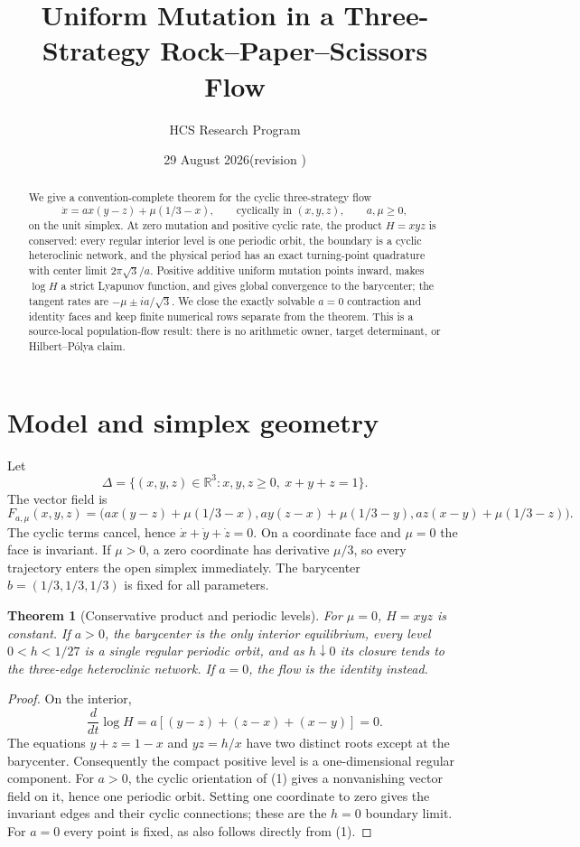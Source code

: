 \documentclass[10pt]{article}
\title{Uniform Mutation in a Three-Strategy Rock--Paper--Scissors Flow}
\author{HCS Research Program}
\date{29 August 2026\quad (revision \CRevisionRound)}
\newtheorem{theorem}{Theorem}
\newcommand{\R}{\mathbb R}
\begin{document}
\maketitle
\begin{abstract}
We give a convention-complete theorem for the cyclic three-strategy flow
\[
 \dot x=ax(y-z)+\mu(1/3-x),\qquad\text{cyclically in }(x,y,z),
 \qquad a,\mu\geq0,
\]
on the unit simplex.  At zero mutation and positive cyclic rate, the product
$H=xyz$ is conserved: every regular interior level is one periodic orbit, the
boundary is a cyclic heteroclinic network, and the physical period has an
exact turning-point quadrature with center limit $2\pi\sqrt3/a$.  Positive additive uniform
mutation points inward, makes $\log H$ a strict Lyapunov function, and gives
global convergence to the barycenter; the tangent rates are
$-\mu\pm ia/\sqrt3$.  We close the exactly solvable $a=0$ contraction and
identity faces and keep finite numerical rows separate from the theorem.
This is a source-local population-flow result: there is no arithmetic owner,
target determinant, or Hilbert--Pólya claim.
\end{abstract}

\section{Model and simplex geometry}
Let
\[
 \Delta=\{(x,y,z)\in\R^3:x,y,z\ge0,\ x+y+z=1\}.
\]
The vector field is
\begin{equation}
 F_{a,\mu}(x,y,z)=\bigl(ax(y-z)+\mu(1/3-x),
 ay(z-x)+\mu(1/3-y),
 az(x-y)+\mu(1/3-z)\bigr). \tag{1}
\end{equation}
The cyclic terms cancel, hence $\dot x+\dot y+\dot z=0$.  On a coordinate
face and $\mu=0$ the face is invariant.  If $\mu>0$, a zero coordinate has
derivative $\mu/3$, so every trajectory enters the open simplex immediately.
The barycenter $b=(1/3,1/3,1/3)$ is fixed for all parameters.

\begin{theorem}[Conservative product and periodic levels]
For $\mu=0$, $H=xyz$ is constant.  If $a>0$, the barycenter is the only
interior equilibrium, every level $0<h<1/27$ is a single regular periodic
orbit, and as $h\downarrow0$ its closure tends to the three-edge
heteroclinic network.  If $a=0$, the flow is the identity instead.
\end{theorem}
\begin{proof}
On the interior,
\[
 \frac{d}{dt}\log H=a[(y-z)+(z-x)+(x-y)]=0. \tag{2}
\]
The equations $y+z=1-x$ and $yz=h/x$ have two distinct roots except at the
barycenter.  Consequently the compact positive level is a one-dimensional
regular component.  For $a>0$, the cyclic orientation of (1) gives a
nonvanishing vector field on it, hence one periodic orbit.  Setting one
coordinate to zero gives the invariant edges and their cyclic connections;
these are the $h=0$ boundary limit.  For $a=0$ every point is fixed, as also
follows directly from (1).
\end{proof}
\end{document}
